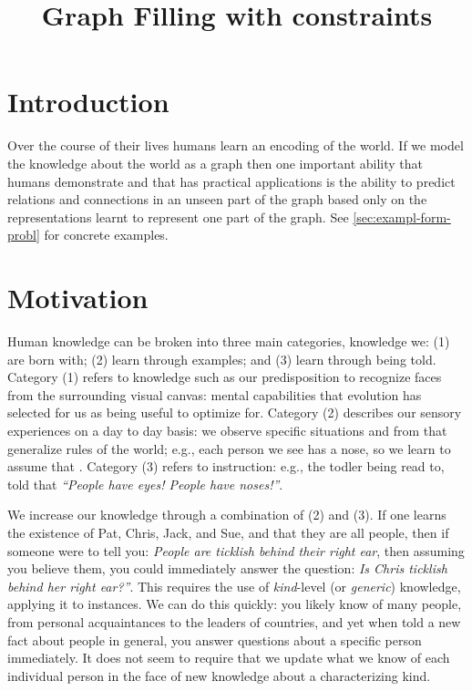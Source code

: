 \documentclass[11pt]{article}
\title{Graph Filling with constraints}
\newcommand{\eg}{e.g.,\xspace}
\begin{document}
\maketitle
\section{Introduction}
\label{sec:introduction}




Over the course of their lives humans learn an encoding of the world.
If we model the knowledge about the world as a graph then one
important ability that humans demonstrate and that has practical
applications is the ability to predict relations and connections in an
unseen part of the graph based only on the representations learnt to
represent one part of the graph. See \ref{sec:exampl-form-probl} for
concrete examples.

\section{Motivation}
Human knowledge can be broken into three main categories, knowledge
we: (1) are born with; (2) learn through examples; and (3) learn
through being told.  Category (1) refers to knowledge such as our
predisposition to recognize faces from the surrounding visual canvas:
mental capabilities that evolution has selected for us as being useful
to optimize for.  Category (2) describes our sensory experiences on a
day to day basis: we observe specific situations and from that
generalize rules of the world; \eg each person we see has a nose, so
we learn to assume that . Category (3) refers
to instruction: \eg the todler being read to, told that \emph{``People
  have eyes! People have noses!''}.

We increase our knowledge through a combination of (2) and (3).  If
one learns the existence of Pat, Chris, Jack, and Sue, and that they
are all people, then if someone were to tell you: \emph{People are
  ticklish behind their right ear}, then assuming you believe them,
you could immediately answer the question: \emph{Is Chris ticklish
  behind her right ear?''}.  This requires the use of
\emph{kind}-level (or \emph{generic}) knowledge, applying it to
instances.  We can do this quickly: you likely know of many people,
from personal acquaintances to the leaders of countries, and yet when
told a new fact about people in general, you answer questions about a
specific person immediately.  It does not seem to require that we
update what we know of each individual person in the face of new
knowledge about a characterizing kind.
\end{document}
